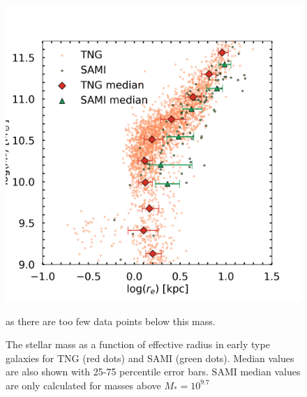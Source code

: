 \begin{figure}
    \centering
    \includegraphics[width=\textwidth]{images/results_mass_radius_FP.png}
    \caption{The stellar mass as a function of effective radius in early type galaxies for TNG (red dots) and SAMI (green dots). Median values are also shown with 25-75 percentile error bars. SAMI median values are only calculated for masses above $M_* = 10^{9.7}$} as there are too few data points below this mass.
    \label{FP_res1}
\end{figure}

